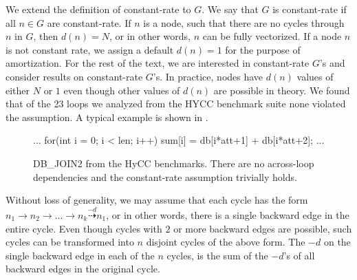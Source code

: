 We extend the definition of constant-rate to $G$. We say that 
$G$ is constant-rate if all $n \in G$ are constant-rate. If $n$ is a node, such that there are no cycles through $n$ in $G$, 
then $d(n) = N$, or in other words, $n$ can be fully vectorized. If a node $n$ is not constant rate, we assign a default $d(n) = 1$ 
for the purpose of amortization. For the rest of the text, we are interested in constant-rate $G$'s and consider  
results on constant-rate $G$'s. In practice, nodes have $d(n)$ values of either $N$ or $1$ even though other values of 
$d(n)$ are possible in theory. We found that of the 23 loops we analyzed from the HYCC \cite{Buscher2018} 
benchmark suite none violated the assumption. A typical example is shown in .
\begin{figure}[h]
\centering
\begin{minipage}{0.7\textwidth}
\begin{javacode}
...
for(int i = 0; i < len; i++) {
    sum[i] = db[i*att+1] + db[i*att+2];
}
...
\end{javacode}
\end{minipage}
\caption{DB_JOIN2 from the HyCC benchmarks. There are no across-loop dependencies and the constant-rate assumption trivially holds.} 
\label{fig:dbjoin2nonconstant}
\end{figure}



Without loss of generality, we may assume that each cycle has the form $n_1 \rightarrow n_2 \rightarrow ... \rightarrow n_k \stackrel{-d}{\dasharrow} n_1$, 
or in other words, there is a single backward edge in the entire cycle. Even though cycles with $2$ or more backward 
edges are possible, such cycles can be transformed into $n$ disjoint cycles of the above form. The $-d$ on the
single backward edge in each of the $n$ cycles, is the sum of the $-d$'s of all backward edges in the original cycle. 

